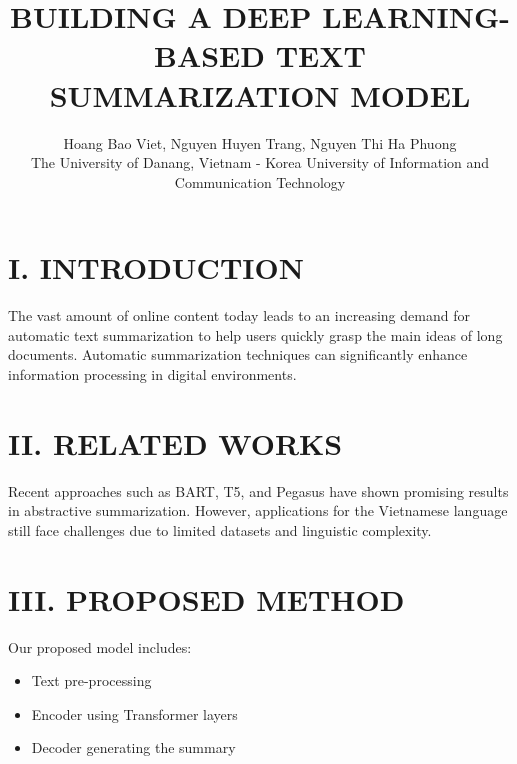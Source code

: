 \documentclass[10pt,twocolumn]{article}
\title{\textbf{\LARGE BUILDING A DEEP LEARNING-BASED TEXT SUMMARIZATION MODEL}}
\author{
Hoang Bao Viet, 
Nguyen Huyen Trang, 
Nguyen Thi Ha Phuong \\
The University of Danang, Vietnam - Korea University of Information and Communication Technology
}
\date{}
\begin{document}

\section*{I. INTRODUCTION}
The vast amount of online content today leads to an increasing demand for automatic text summarization to help users quickly grasp the main ideas of long documents. Automatic summarization techniques can significantly enhance information processing in digital environments.

\vspace{1em}
\section*{II. RELATED WORKS}
Recent approaches such as BART, T5, and Pegasus have shown promising results in abstractive summarization. However, applications for the Vietnamese language still face challenges due to limited datasets and linguistic complexity.

\vspace{1em}
\section*{III. PROPOSED METHOD}
Our proposed model includes:

\begin{itemize}[noitemsep]
  \item Text pre-processing
  \item Encoder using Transformer layers
  \item Decoder generating the summary
\end{itemize}
\end{document}
